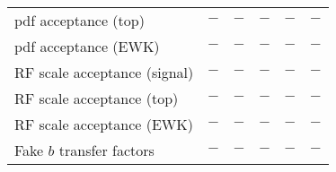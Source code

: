 {\begin{tabular}{l|c|c|ccc}
pdf acceptance (top)         & $-$ & $-$            & $-$ & $-$    & $-$      \\ 
pdf acceptance (EWK)         & $-$ & $-$            & $-$ & $-$    & $-$      \\ 
RF scale acceptance (signal) & $-$ & $-$            & $-$ & $-$    & $-$      \\ 
RF scale acceptance (top)    & $-$ & $-$            & $-$ & $-$    & $-$      \\ 
RF scale acceptance (EWK)    & $-$ & $-$            & $-$ & $-$    & $-$      \\ 
Fake $b$ transfer factors    & $-$ & $-$            & $-$ & $-$    & $-$      \\ 
\hline
\end{tabular}
}
\renewcommand{\arraystretch}{1}
